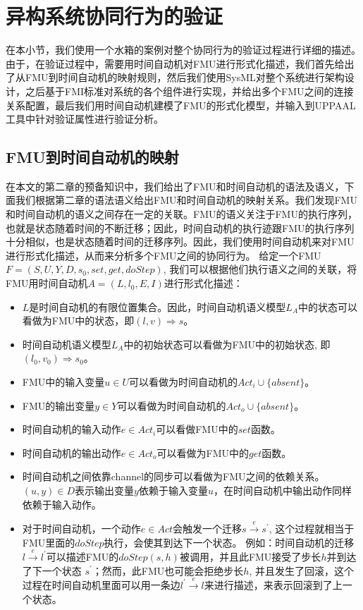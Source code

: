 \section{异构系统协同行为的验证}
在本小节，我们使用一个水箱的案例对整个协同行为的验证过程进行详细的描述。由于，在验证过程中，需要用时间自动机对FMU进行形式化描述，我们首先给出了从FMU到时间自动机的映射规则，然后我们使用SysML对整个系统进行架构设计，之后基于FMI标准对系统的各个组件进行实现，并给出多个FMU之间的连接关系配置，最后我们用时间自动机建模了FMU的形式化模型，并输入到UPPAAL工具中针对验证属性进行验证分析。
\subsection{FMU到时间自动机的映射} 
\label{sec:encode}
在本文的第二章的预备知识中，我们给出了FMU和时间自动机的语法及语义，下面我们根据第二章的语法语义给出FMU和时间自动机的映射关系。我们发现FMU和时间自动机的语义之间存在一定的关联。FMU的语义关注于FMU的执行序列，也就是状态随着时间的不断迁移；因此，时间自动机的执行迹跟FMU的执行序列十分相似，也是状态随着时间的迁移序列。因此，我们使用时间自动机来对FMU进行形式化描述，从而来分析多个FMU之间的协同行为。
给定一个FMU$F=(S,U,Y,D,s_{0},set,get,doStep)$, 我们可以根据他们执行语义之间的关联，将FMU用时间自动机$\textit{A}=(L,l_{0},E,I)$进行形式化描述：
\begin{itemize}
\item
$L$是时间自动机的有限位置集合。因此，时间自动机语义模型$L_{\textit{A}}$中的状态可以看做为FMU中的状态，即$(l,v) \Rightarrow s$。
\item
时间自动机语义模型$L_{\textit{A}}$中的初始状态可以看做为FMU中的初始状态, 即$(l_{0},v_{0}) \Rightarrow s_{0}$。
\item
FMU中的输入变量$u \in U$可以看做为时间自动机的$Act_{i} \cup \{absent\}$。
\item
FMU的输出变量$y \in Y$可以看做为时间自动机的$Act_{o} \cup \{absent\}$。
\item
时间自动机的输入动作$e \in Act_{i}$可以看做FMU中的$set$函数。
\item
时间自动机的输出动作$e \in Act_{o}$可以看做为FMU中的$get$函数。  
\item
时间自动机之间依靠channel的同步可以看做为FMU之间的依赖关系。 $(u,y) \in D$表示输出变量$y$依赖于输入变量$u$，在时间自动机中输出动作同样依赖于输入动作。
\item
对于时间自动机，一个动作$e \in Act$会触发一个迁移$s \xrightarrow{e} s^{\prime}$, 这个过程就相当于FMU里面的$doStep$执行，会使其到达下一个状态。 例如：时间自动机的迁移$l \xrightarrow{e} l^{\prime}$可以描述FMU的$doStep(s,h)$被调用，并且此FMU接受了步长$h$并到达了下一个状态 $s^{\prime}$；然而，此FMU也可能会拒绝步长$h$, 并且发生了回滚，这个过程在时间自动机里面可以用一条边$l^{\prime} \xrightarrow{e} l$来进行描述，来表示回滚到了上一个状态。

\end{itemize}
